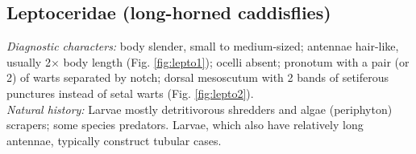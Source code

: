 \documentclass[letterpaper, 11pt]{article}
\begin{document}
\subsection{Leptoceridae (long-horned caddisflies)}%
\noindent{}\textit{Diagnostic characters:} body slender, small to medium-sized; antennae hair-like, usually 2$\times$ body length (Fig. \ref{fig:lepto1}); ocelli absent; pronotum with a pair (or 2) of warts separated by notch; dorsal mesoscutum with 2 bands of setiferous punctures instead of setal warts (Fig. \ref{fig:lepto2}).\\

\noindent{}\textit{Natural history:} Larvae mostly detritivorous shredders and algae (periphyton) scrapers; some species predators. Larvae, which also have relatively long antennae, typically construct tubular cases.
\end{document}
